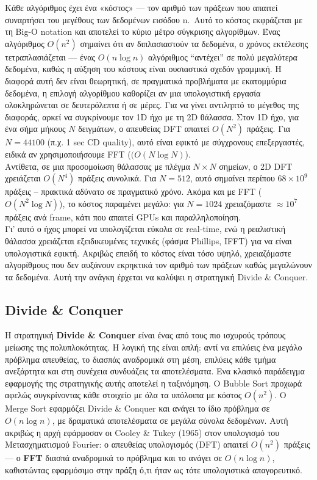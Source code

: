 \documentclass[
  a4paper,
  11pt,
]{article}
\begin{document}
Κάθε αλγόριθμος έχει ένα «κόστος» --- τον αριθμό των πράξεων που απαιτεί
συναρτήσει του μεγέθους των δεδομένων εισόδου n.~Αυτό το κόστος
εκφράζεται με τη Big-O notation και αποτελεί το κύριο μέτρο σύγκρισης
αλγορίθμων. Ένας αλγόριθμος \(O(n^2)\) σημαίνει ότι αν διπλασιαστούν τα
δεδομένα, ο χρόνος εκτέλεσης τετραπλασιάζεται --- ένας \(O(n \log n)\)
αλγόριθμος ``αντέχει'' σε πολύ μεγαλύτερα δεδομένα, καθώς η αύξηση του
κόστους είναι ουσιαστικά σχεδόν γραμμική. Η διαφορά αυτή δεν είναι
θεωρητική, σε πραγματικά προβλήματα με εκατομμύρια δεδομένα, η επιλογή
αλγορίθμου καθορίζει αν μια υπολογιστική εργασία ολοκληρώνεται σε
δευτερόλεπτα ή σε μέρες. Για να γίνει αντιληπτό το μέγεθος της διαφοράς,
αρκεί να συγκρίνουμε τον 1D ήχο με τη 2D θάλασσα. Στον 1D ήχο, για ένα
σήμα μήκους \(N\) δειγμάτων, ο απευθείας DFT απαιτεί \(O(N^2)\) πράξεις.
Για \(N=44100\) (π.χ. 1 sec CD quality), αυτό είναι εφικτό με σύγχρονους
επεξεργαστές, ειδικά αν χρησιμοποιήσουμε FFT (\((O(N \log N)\)).\\
Αντίθετα, σε μια προσομοίωση θάλασσας με πλέγμα \(N \times N\) σημείων,
ο 2D DFT χρειάζεται \(O(N^4)\) πράξεις συνολικά. Για \(N=512\), αυτό
σημαίνει περίπου \(68 \times 10^9\) πράξεις -- πρακτικά αδύνατο σε
πραγματικό χρόνο. Ακόμα και με FFT (\(O(N^2 \log N)\)), το κόστος
παραμένει μεγάλο: για \(N=1024\) χρειαζόμαστε \(\approx 10^7\) πράξεις
ανά frame, κάτι που απαιτεί GPUs και παραλληλοποίηση.\\
Γι' αυτό ο ήχος μπορεί να υπολογίζεται εύκολα σε real‑time, ενώ η
ρεαλιστική θάλασσα χρειάζεται εξειδικευμένες τεχνικές (φάσμα Phillips,
IFFT) για να είναι υπολογιστικά εφικτή. Ακριβώς επειδή το κόστος είναι
τόσο υψηλό, χρειαζόμαστε αλγορίθμους που δεν αυξάνουν εκρηκτικά τον
αριθμό των πράξεων καθώς μεγαλώνουν τα δεδομένα. Αυτή την ανάγκη έρχεται
να καλύψει η στρατηγική Divide \& Conquer.

\subsection{Divide \& Conquer}\label{divide-conquer}

Η στρατηγική \textbf{Divide \& Conquer} είναι ένας από τους πιο ισχυρούς
τρόπους μείωσης της πολυπλοκότητας. Η λογική της είναι απλή: αντί να
επιλύεις ένα μεγάλο πρόβλημα απευθείας, το διασπάς αναδρομικά στη μέση,
επιλύεις κάθε τμήμα ανεξάρτητα και στη συνέχεια συνδυάζεις τα
αποτελέσματα. Ενα κλασικό παράδειγμα εφαρμογής της στρατηγικής αυτής
αποτελεί η ταξινόμηση. Ο Bubble Sort προχωρά αφελώς συγκρίνοντας κάθε
στοιχείο με όλα τα υπόλοιπα με κόστος \(O(n^2)\). Ο Merge Sort εφαρμόζει
Divide \& Conquer και ανάγει το ίδιο πρόβλημα σε \(O(n \log n)\), με
δραματικά αποτελέσματα σε μεγάλα σύνολα δεδομένων. Αυτή ακριβώς η αρχή
εφάρμοσαν οι Cooley \& Tukey (1965) στον υπολογισμό του Μετασχηματισμού
Fourier: ο απευθείας υπολογισμός (DFT) απαιτεί \(O(n^2)\) πράξεις --- ο
\textbf{FFT} διασπά αναδρομικά το πρόβλημα και το ανάγει σε
\(O(n \log n)\), καθιστώντας εφαρμόσιμο στην πράξη ό,τι ήταν ως τότε
υπολογιστικά απαγορευτικό.
\end{document}
